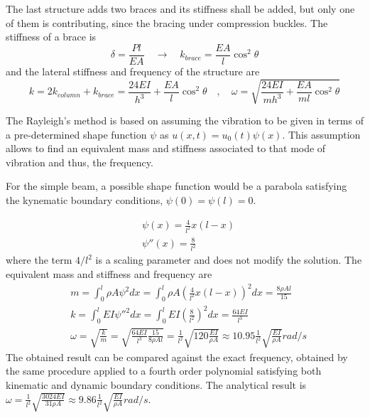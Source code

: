 \documentclass{problems}
\begin{document}
\begin{center}
\end{center}

The last structure adds two braces and its stiffness shall be added, but only one of them is contributing, since the bracing under compression buckles. The stiffness of a brace is
$$
\delta = \frac{Pl}{EA} \quad \rightarrow \quad k_{brace} = \frac{EA}{l}\cos^2\theta
$$
and the lateral stiffness and frequency of the structure are
$$
k = 2k_{column} + k_{brace} = \frac{24EI}{h^3}+\frac{EA}{l}\cos^2\theta \quad , \quad 
\omega = \sqrt{\frac{24EI}{mh^3}+\frac{EA}{ml}\cos^2\theta}
$$



The Rayleigh's method is based on assuming the vibration to be given in terms of a pre-determined shape function $\psi$ as $u(x,t) = u_0(t)\psi(x)$. This assumption allows to find an equivalent mass and stiffness associated to that mode of vibration and thus, the frequency.

\parbox{.7\textwidth}{For the simple beam, a possible shape function would be a parabola satisfying the kynematic boundary conditions, $\psi(0) = \psi(l) = 0$.} \hspace{1em}
\parbox{.25\textwidth}{}
\begin{align*}
&\psi(x) = \frac{4}{l^2} x (l-x) \\
&\psi''(x) = \frac{8}{l^2}
\end{align*}
where the term $4/l^2$ is a scaling parameter and does not modify the solution. The equivalent mass and stiffness and frequency are
\begin{align*}
&m = \int_0^l \rho A\psi^2dx = \int_0^l \rho A \left(\frac{4}{l^2} x (l-x)\right)^2dx = \frac{8\rho Al}{15} \\
&k = \int_0^l EI \psi''^2 dx = \int_0^l EI \left(\frac{8}{l^2}\right)^2dx = \frac{64EI}{l^3} \\
&\omega = \sqrt{\frac{k}{m}} = \sqrt{\frac{64EI}{l^3}\frac{15}{8\rho Al}} = \frac{1}{l^2}\sqrt{120\frac{EI}{\rho A}} \approx 10.95\frac{1}{l^2}\sqrt{\frac{EI}{\rho A}} rad/s
\end{align*}
The obtained result can be compared against the exact frequency, obtained by the same procedure applied to a fourth order polynomial satisfying both kinematic and dynamic boundary conditions. The analytical result is $\omega = \frac{1}{l^2}\sqrt{\frac{3024EI}{31\rho A}} \approx 9.86\frac{1}{l^2}\sqrt{\frac{EI}{\rho A}} rad/s$.
\end{document}
